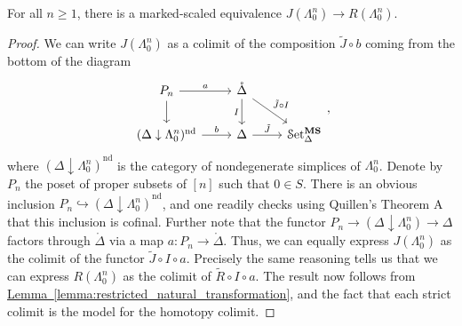 \documentclass[main.tex]{subfiles}
\begin{document}
\begin{lemma}
  \label{lemma:marked_scaled_equivalence_left_horn}
  For all $n \geq 1$, there is a marked-scaled equivalence $J(\Lambda^{n}_{0}) \to R(\Lambda^{n}_{0})$.
\end{lemma}
\begin{proof}
  We can write $J(\Lambda^{n}_{0})$ as a colimit of the composition $\tilde{J} \circ b$ coming from the bottom of the diagram
  \begin{equation*}
    \begin{tikzcd}
      P_{n}
      \arrow[d]
      \arrow[r, "a"]
      & \mathring{\Delta}
      \arrow[d, swap, "I"]
      \arrow[dr, "\tilde{J} \circ I"]
      \\
      (\Delta \downarrow \Lambda^{n}_{0})^{\mathrm{nd}}
      \arrow[r, "b"]
      & \Delta
      \arrow[r, "\tilde{J}"]
      &\SSetms
    \end{tikzcd},
  \end{equation*}
  where $(\Delta \downarrow \Lambda^{n}_{0})^{\mathrm{nd}}$ is the category of nondegenerate simplices of $\Lambda^{n}_{0}$. Denote by $P_{n}$ the poset of proper subsets of $[n]$ such that $0 \in S$. There is an obvious inclusion $P_{n} \hookrightarrow (\Delta \downarrow \Lambda^{n}_{0})^{\mathrm{nd}}$, and one readily checks using Quillen's Theorem A that this inclusion is cofinal. Further note that the functor $P_{n} \to (\Delta \downarrow \Lambda^{n}_{0}) \to \Delta$ factors through $\mathring{\Delta}$ via a map $a\colon P_{n} \to \mathring{\Delta}$. Thus, we can equally express $J(\Lambda^{n}_{0})$ as the colimit of the functor $\tilde{J} \circ I \circ a$. Precisely the same reasoning tells us that we can express $R(\Lambda^{n}_{0})$ as the colimit of $\tilde{R} \circ I \circ a$. The result now follows from \hyperref[lemma:restricted_natural_transformation]{Lemma~\ref*{lemma:restricted_natural_transformation}}, and the fact that each strict colimit is the model for the homotopy colimit.
\end{proof}
\end{document}
